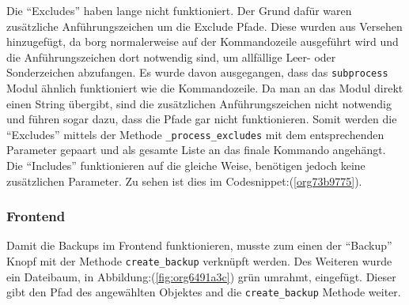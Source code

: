 Die "`Excludes"' haben lange nicht funktioniert. Der Grund dafür waren
zusätzliche Anführungszeichen um die Exclude Pfade. Diese wurden aus Versehen
hinzugefügt, da \gls{borg} normalerweise auf der Kommandozeile ausgeführt wird
und die Anführungszeichen dort notwendig sind, um allfällige Leer- oder
Sonderzeichen abzufangen. Es wurde davon ausgegangen, dass das
\texttt{subprocess} Modul ähnlich funktioniert wie die Kommandozeile. Da man an
das Modul direkt einen String übergibt, sind die zusätzlichen Anführungszeichen
nicht notwendig und führen sogar dazu, dass die Pfade gar nicht funktionieren.
Somit werden die "`Excludes"' mittels der Methode \texttt{\_process\_excludes}
mit dem entsprechenden Parameter gepaart und als gesamte Liste an das finale
Kommando angehängt. Die "`Includes"' funktionieren auf die gleiche Weise,
benötigen jedoch keine zusätzlichen Parameter. Zu sehen ist dies im
Codesnippet:(\ref{org73b9775}).
\newpage
{}

\newpage
\subsubsection{Frontend}
\label{sec:org148b087}

Damit die Backups im Frontend funktionieren, musste zum einen der "`Backup"'
Knopf mit der Methode \texttt{create\_backup} verknüpft werden. Des Weiteren
wurde ein Dateibaum, in Abbildung:(\ref{fig:org6491a3c}) grün umrahmt,
eingefügt. Dieser gibt den Pfad des angewählten Objektes and die
\texttt{create\_backup} Methode weiter.

